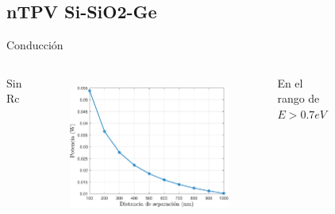 \documentclass[spanish,a4paper]{beamer}%
\newcommand{\resCondPath}{\graphicspath{{./figuras/Resultados/conduccion/}}}
\begin{document}
	\subsection{nTPV Si-SiO2-Ge}
	\begin{frame}{Conducción}
			\resCondPath
			\begin{columns}
						\begin{block}{\centering Sin Rc}
						\end{block}
					\vspace{15pt}
						\begin{figure}[h]%
								\centering
										\includegraphics[width=\columnwidth]{Pn_SiSiO2Ge}
								\label{fig:SiSiO2Ge_cond}%
						\end{figure}
						\vfill
					\vspace{-15pt}
						\begin{block}{\centering En el rango de $E>0.7eV$}
							\end{block}
					\vspace{10pt}
						\begin{figure}[h]%
								\centering

\end{figure}
\end{columns}
\end{frame}
\end{document}

